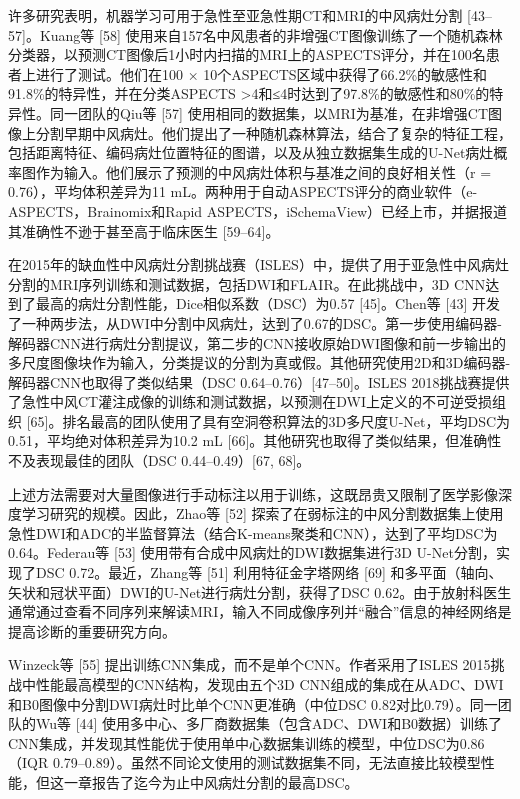 \documentclass[11pt]{article}
\begin{document}
许多研究表明，机器学习可用于急性至亚急性期CT和MRI的中风病灶分割 [43–57]。Kuang等 [58] 使用来自157名中风患者的非增强CT图像训练了一个随机森林分类器，以预测CT图像后1小时内扫描的MRI上的ASPECTS评分，并在100名患者上进行了测试。他们在100 × 10个ASPECTS区域中获得了66.2\%的敏感性和91.8\%的特异性，并在分类ASPECTS >4和≤4时达到了97.8\%的敏感性和80\%的特异性。同一团队的Qiu等 [57] 使用相同的数据集，以MRI为基准，在非增强CT图像上分割早期中风病灶。他们提出了一种随机森林算法，结合了复杂的特征工程，包括距离特征、编码病灶位置特征的图谱，以及从独立数据集生成的U-Net病灶概率图作为输入。他们展示了预测的中风病灶体积与基准之间的良好相关性（r = 0.76），平均体积差异为11 mL。两种用于自动ASPECTS评分的商业软件（e-ASPECTS，Brainomix和Rapid ASPECTS，iSchemaView）已经上市，并据报道其准确性不逊于甚至高于临床医生 [59–64]。

在2015年的缺血性中风病灶分割挑战赛（ISLES）中，提供了用于亚急性中风病灶分割的MRI序列训练和测试数据，包括DWI和FLAIR。在此挑战中，3D CNN达到了最高的病灶分割性能，Dice相似系数（DSC）为0.57 [45]。Chen等 [43] 开发了一种两步法，从DWI中分割中风病灶，达到了0.67的DSC。第一步使用编码器-解码器CNN进行病灶分割提议，第二步的CNN接收原始DWI图像和前一步输出的多尺度图像块作为输入，分类提议的分割为真或假。其他研究使用2D和3D编码器-解码器CNN也取得了类似结果（DSC 0.64–0.76）[47–50]。ISLES 2018挑战赛提供了急性中风CT灌注成像的训练和测试数据，以预测在DWI上定义的不可逆受损组织 [65]。排名最高的团队使用了具有空洞卷积算法的3D多尺度U-Net，平均DSC为0.51，平均绝对体积差异为10.2 mL [66]。其他研究也取得了类似结果，但准确性不及表现最佳的团队（DSC 0.44–0.49）[67, 68]。

上述方法需要对大量图像进行手动标注以用于训练，这既昂贵又限制了医学影像深度学习研究的规模。因此，Zhao等 [52] 探索了在弱标注的中风分割数据集上使用急性DWI和ADC的半监督算法（结合K-means聚类和CNN），达到了平均DSC为0.64。Federau等 [53] 使用带有合成中风病灶的DWI数据集进行3D U-Net分割，实现了DSC 0.72。最近，Zhang等 [51] 利用特征金字塔网络 [69] 和多平面（轴向、矢状和冠状平面）DWI的U-Net进行病灶分割，获得了DSC 0.62。由于放射科医生通常通过查看不同序列来解读MRI，输入不同成像序列并“融合”信息的神经网络是提高诊断的重要研究方向。

Winzeck等 [55] 提出训练CNN集成，而不是单个CNN。作者采用了ISLES 2015挑战中性能最高模型的CNN结构，发现由五个3D CNN组成的集成在从ADC、DWI和B0图像中分割DWI病灶时比单个CNN更准确（中位DSC 0.82对比0.79）。同一团队的Wu等 [44] 使用多中心、多厂商数据集（包含ADC、DWI和B0数据）训练了CNN集成，并发现其性能优于使用单中心数据集训练的模型，中位DSC为0.86（IQR 0.79–0.89）。虽然不同论文使用的测试数据集不同，无法直接比较模型性能，但这一章报告了迄今为止中风病灶分割的最高DSC。
\end{document}

